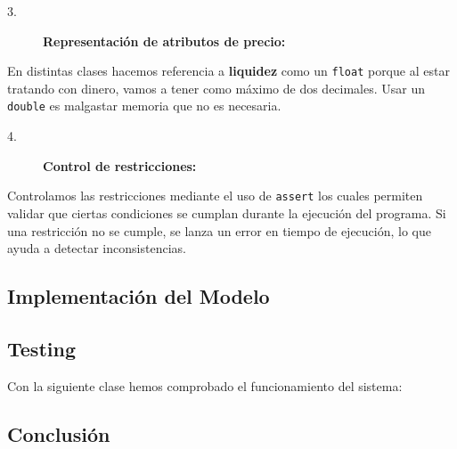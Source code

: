 \begin{description}
    \item[3.] \textbf{Representación de atributos de precio:}
\end{description}
En distintas clases hacemos referencia a \textbf{liquidez} como un \texttt{float} porque al estar tratando con dinero, vamos a tener como máximo de dos decimales. Usar un \texttt{double} es malgastar  memoria que no es necesaria.
\vspace{0.20cm}

\begin{description}
    \item[4.] \textbf{Control de restricciones:}
\end{description}
Controlamos las restricciones mediante el uso de \texttt{assert} los cuales permiten validar que ciertas condiciones se cumplan durante la ejecución del programa. Si una restricción no se cumple, se lanza un error en tiempo de ejecución, lo que ayuda a detectar inconsistencias.


\newpage



\subsection{Implementación del Modelo}


\subsection{Testing}
Con la siguiente clase hemos comprobado el funcionamiento del sistema:


\subsection{Conclusión}

